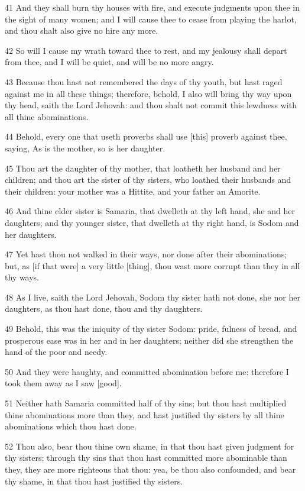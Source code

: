 \par 41 And they shall burn thy houses with fire, and execute judgments upon thee in the sight of many women; and I will cause thee to cease from playing the harlot, and thou shalt also give no hire any more.
\par 42 So will I cause my wrath toward thee to rest, and my jealousy shall depart from thee, and I will be quiet, and will be no more angry.
\par 43 Because thou hast not remembered the days of thy youth, but hast raged against me in all these things; therefore, behold, I also will bring thy way upon thy head, saith the Lord Jehovah: and thou shalt not commit this lewdness with all thine abominations.
\par 44 Behold, every one that useth proverbs shall use [this] proverb against thee, saying, As is the mother, so is her daughter.
\par 45 Thou art the daughter of thy mother, that loatheth her husband and her children; and thou art the sister of thy sisters, who loathed their husbands and their children: your mother was a Hittite, and your father an Amorite.
\par 46 And thine elder sister is Samaria, that dwelleth at thy left hand, she and her daughters; and thy younger sister, that dwelleth at thy right hand, is Sodom and her daughters.
\par 47 Yet hast thou not walked in their ways, nor done after their abominations; but, as [if that were] a very little [thing], thou wast more corrupt than they in all thy ways.
\par 48 As I live, saith the Lord Jehovah, Sodom thy sister hath not done, she nor her daughters, as thou hast done, thou and thy daughters.
\par 49 Behold, this was the iniquity of thy sister Sodom: pride, fulness of bread, and prosperous ease was in her and in her daughters; neither did she strengthen the hand of the poor and needy.
\par 50 And they were haughty, and committed abomination before me: therefore I took them away as I saw [good].
\par 51 Neither hath Samaria committed half of thy sins; but thou hast multiplied thine abominations more than they, and hast justified thy sisters by all thine abominations which thou hast done.
\par 52 Thou also, bear thou thine own shame, in that thou hast given judgment for thy sisters; through thy sins that thou hast committed more abominable than they, they are more righteous that thou: yea, be thou also confounded, and bear thy shame, in that thou hast justified thy sisters.
